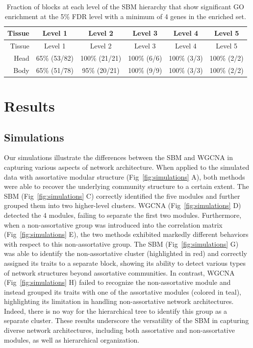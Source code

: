 \documentclass[
]{article}
\begin{document}
\begin{longtable}[]{@{}rccccc@{}}
\caption{Fraction of blocks at each level of the SBM hierarchy that show
significant GO enrichment at the 5\% FDR level with a minimum of 4 genes
in the enriched set.}\tabularnewline
\toprule\noalign{}
Tissue & Level 1 & Level 2 & Level 3 & Level 4 & Level 5 \\
\midrule\noalign{}
\endfirsthead
\toprule\noalign{}
Tissue & Level 1 & Level 2 & Level 3 & Level 4 & Level 5 \\
\midrule\noalign{}
\endhead
\bottomrule\noalign{}
\endlastfoot
Head & 65\% (53/82) & 100\% (21/21) & 100\% (6/6) & 100\% (3/3) & 100\%
(2/2) \\
Body & 65\% (51/78) & 95\% (20/21) & 100\% (9/9) & 100\% (3/3) & 100\%
(2/2) \\
\end{longtable}

\section{Results}\label{results}

\subsection{Simulations}\label{simulations-1}

Our simulations illustrate the differences between the SBM and WGCNA in
capturing various aspects of network architecture. When applied to the
simulated data with assortative modular structure
(Fig~\ref{fig:simulations} A), both methods were able to recover the
underlying community structure to a certain extent. The SBM
(Fig~\ref{fig:simulations} C) correctly identified the five modules and
further grouped them into two higher-level clusters. WGCNA
(Fig~\ref{fig:simulations} D) detected the 4 modules, failing to
separate the first two modules. Furthermore, when a non-assortative
group was introduced into the correlation matrix
(Fig~\ref{fig:simulations} E), the two methods exhibited markedly
different behaviors with respect to this non-assortative group. The SBM
(Fig~\ref{fig:simulations} G) was able to identify the non-assortative
cluster (highlighted in red) and correctly assigned its traits to a
separate block, showing its ability to detect various types of network
structures beyond assortative communities. In contrast, WGCNA
(Fig~\ref{fig:simulations} H) failed to recognize the non-assortative
module and instead grouped its traits with one of the assortative
modules (colored in teal), highlighting its limitation in handling
non-assortative network architectures. Indeed, there is no way for the
hierarchical tree to identify this group as a separate cluster. These
results underscore the versatility of the SBM in capturing diverse
network architectures, including both assortative and non-assortative
modules, as well as hierarchical organization.
\end{document}
